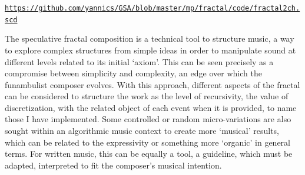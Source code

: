 \documentclass{article}
\begin{document}
\noindent \href{https://github.com/yannics/GSA/blob/master/mp/fractal/code/fractal2ch.scd}{\scriptsize \texttt{https://github.com/yannics/GSA/blob/master/mp/fractal/code/fractal2ch.scd}}
\bigskip

The speculative fractal composition is a technical tool to structure music, a way to explore complex structures from simple ideas in order to manipulate sound at different levels related to its initial `axiom'. This can be seen precisely as a compromise between simplicity and complexity\cite{hp}, an edge over which the funambulist composer evolves.
With this approach, different aspects of the fractal can be considered to structure the work as the level of recursivity, the value of discretization, with the related object of each event when it is provided, to name those I have implemented. 
Some controlled or random micro-variations are also sought within an algorithmic music context to create more `musical' results, which can be related to the expressivity or something more `organic' in general terms. For written music, this can be equally a tool, a guideline, which must be adapted,  interpreted to fit the composer's musical intention.
 \bigskip
 
 
%
%
%
%
\end{document}
